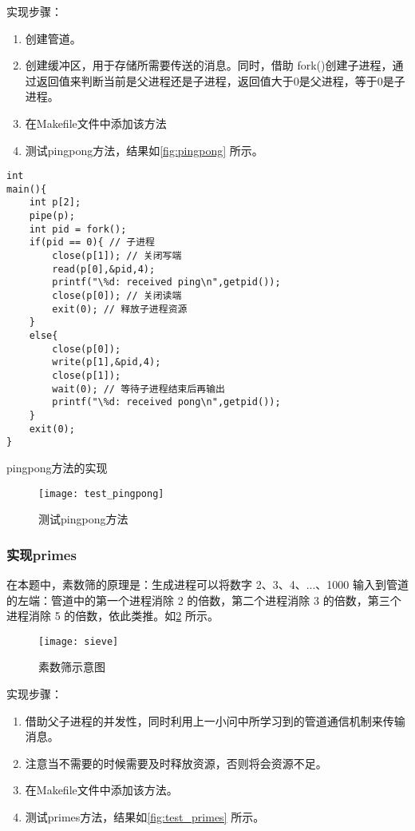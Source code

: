 实现步骤：
\begin{enumerate}
	\item 创建管道。
	\item 创建缓冲区，用于存储所需要传送的消息。同时，借助 fork()创建子进程，通过返回值来判断当前是父进程还是子进程，返回值大于0是父进程，等于0是子进程。
	\item 在Makefile文件中添加该方法
	\item 测试pingpong方法，结果如\cref{fig:pingpong} 所示。
\end{enumerate}

\begin{listing}[!htb]
	\begin{verbatim}
int
main(){
    int p[2];
    pipe(p); 
    int pid = fork();
    if(pid == 0){ // 子进程
        close(p[1]); // 关闭写端
        read(p[0],&pid,4);
        printf("\%d: received ping\n",getpid());
        close(p[0]); // 关闭读端
        exit(0); // 释放子进程资源
    }
    else{
        close(p[0]);
        write(p[1],&pid,4);
        close(p[1]);
        wait(0); // 等待子进程结束后再输出
        printf("\%d: received pong\n",getpid());
    }
    exit(0);
}
	\end{verbatim}
	\caption{pingpong方法的实现}\label{lst:test_pingpong}
\end{listing}

\begin{figure}[!htb]
	\centering
	\texttt{[image: test\_pingpong]}
	\caption{测试pingpong方法}
	\label{fig:test_pingpong}
\end{figure}

\subsubsection{实现primes}

在本题中，素数筛的原理是：生成进程可以将数字 2、3、4、...、1000 输入到管道的左端：管道中的第一个进程消除 2 的倍数，第二个进程消除 3 的倍数，第三个进程消除 5 的倍数，依此类推。如\cref{fig:sieve} 所示。

\begin{figure}[!htb]
	\centering
	\texttt{[image: sieve]}
	\caption{素数筛示意图}
	\label{fig:sieve}
\end{figure}

实现步骤：
\begin{enumerate}
	\item 借助父子进程的并发性，同时利用上一小问中所学习到的管道通信机制来传输消息。
	\item 注意当不需要的时候需要及时释放资源，否则将会资源不足。
	\item 在Makefile文件中添加该方法。
	\item 测试primes方法，结果如\cref{fig:test_primes} 所示。
\end{enumerate}

